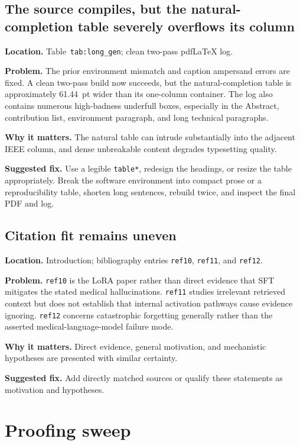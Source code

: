 \documentclass[11pt]{article}
\newcommand{\findinglabel}[1]{\textbf{#1}}
\begin{document}
\subsection*{The source compiles, but the natural-completion table severely overflows its column}

\findinglabel{Location.} Table~\texttt{tab:long\_gen}; clean two-pass pdfLaTeX log.

\findinglabel{Problem.} The prior environment mismatch and caption ampersand errors are fixed.  A clean two-pass build now succeeds, but the natural-completion table is approximately 61.44~pt wider than its one-column container.  The log also contains numerous high-badness underfull boxes, especially in the Abstract, contribution list, environment paragraph, and long technical paragraphs.

\findinglabel{Why it matters.} The natural table can intrude substantially into the adjacent IEEE column, and dense unbreakable content degrades typesetting quality.

\findinglabel{Suggested fix.} Use a legible \texttt{table*}, redesign the headings, or resize the table appropriately.  Break the software environment into compact prose or a reproducibility table, shorten long sentences, rebuild twice, and inspect the final PDF and log.

\subsection*{Citation fit remains uneven}

\findinglabel{Location.} Introduction; bibliography entries \texttt{ref10}, \texttt{ref11}, and \texttt{ref12}.

\findinglabel{Problem.} \texttt{ref10} is the LoRA paper rather than direct evidence that SFT mitigates the stated medical hallucinations.  \texttt{ref11} studies irrelevant retrieved context but does not establish that internal activation pathways cause evidence ignoring.  \texttt{ref12} concerns catastrophic forgetting generally rather than the asserted medical-language-model failure mode.

\findinglabel{Why it matters.} Direct evidence, general motivation, and mechanistic hypotheses are presented with similar certainty.

\findinglabel{Suggested fix.} Add directly matched sources or qualify these statements as motivation and hypotheses.

\section*{Proofing sweep}
\end{document}
